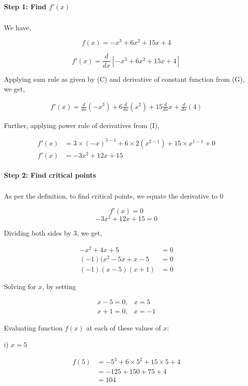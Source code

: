 \documentclass[a4paper]{report}
\begin{document}
\paragraph{Step 1: Find $f'(x)$}

\subparagraph{}

We have,

$$f(x)=-x^3+6x^2+15x+4$$

$$ f'(x)=\frac{d}{dx}[-x^3+6x^2+15x+4]$$

Applying sum rule as given by (C) and derivative of constant function from (G), we get,

\begin{align*}
    f'(x)=\frac{d}{dx}(-x^3)+6\frac{d}{dx}(x^2)+15\frac{d}{dx}x+\frac{d}{dx}(4)
\end{align*}

Further, applying power rule of derivatives from (I),

\begin{align*}
    f'(x)&=3\times(-x)^{3-1}+6\times2(x^{2-1})+15\times x^{1-1}+0 \\
    f'(x)&=-3x^2+12x+15
\end{align*}


\paragraph{Step 2: Find critical points}

\subparagraph{}

As per the definition, to find critical points, we equate the derivative to $0$

$$f'(x) =0$$
$$-3x^2+12x+15 = 0$$

Dividing both sides by 3, we get,

\begin{align*}
    -x^2+4x+5&=0 \\
    (-1) (x^2-5x+x-5&=0 \\
    (-1)(x-5)(x+1)&=0
\end{align*}



Solving for $x$, by setting


$$\begin{array}{cc}
    x-5=0, & x=5  \\
     x+1=0, & x=-1
\end{array}$$


Evaluating function $f(x)$ at each of these values of $x$:

i) $x=5$

\begin{align*}
    f(5)&=-5^3+6\times 5^2+15 \times 5+4 \\
        &=-125+150+75+4 \\
        &=104
\end{align*}
\end{document}
